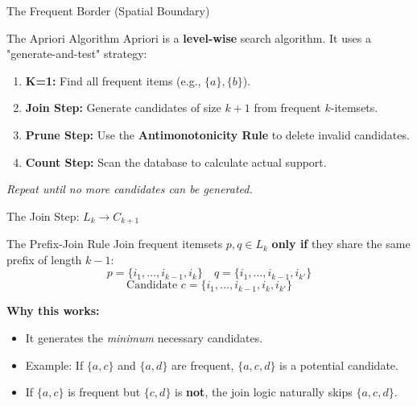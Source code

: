 \begin{frame}{The Frequent Border (Spatial Boundary)}
\end{frame}

\begin{frame}{The Apriori Algorithm}
    Apriori is a \textbf{level-wise} search algorithm. It uses a "generate-and-test" strategy:
    
    \begin{enumerate}
        \item \textbf{K=1:} Find all frequent items (e.g., $\{a\}, \{b\}$).
        \item \textbf{Join Step:} Generate candidates of size $k+1$ from frequent $k$-itemsets.
        \item \textbf{Prune Step:} Use the \textbf{Antimonotonicity Rule} to delete invalid candidates.
        \item \textbf{Count Step:} Scan the database to calculate actual support.
    \end{enumerate}

    \vfill
    \begin{center}
        \textit{Repeat until no more candidates can be generated.}
    \end{center}
\end{frame}

\begin{frame}{The Join Step: $L_k \to C_{k+1}$}
    \begin{alertblock}{The Prefix-Join Rule}
        Join frequent itemsets $p, q \in L_k$ \textbf{only if} they share the same prefix of length $k-1$:
        \[ p = \{i_1, \dots, i_{k-1}, i_k\} \quad q = \{i_1, \dots, i_{k-1}, i_{k'}\} \]
        \[ \text{Candidate } c = \{i_1, \dots, i_{k-1}, i_k, i_{k'}\} \]
    \end{alertblock}

    \vfill

    \textbf{Why this works:}
    \begin{itemize}
        \item It generates the \textit{minimum} necessary candidates.
        \item Example: If $\{a, c\}$ and $\{a, d\}$ are frequent, $\{a, c, d\}$ is a potential candidate.
        \item If $\{a, c\}$ is frequent but $\{c, d\}$ is \textbf{not}, the join logic naturally skips $\{a, c, d\}$.
    \end{itemize}
\end{frame}

